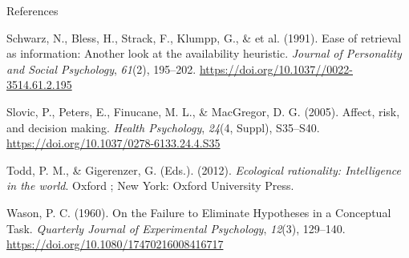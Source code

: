 \documentclass[
  ignorenonframetext,
]{beamer}
\newlength{\cslhangindent}
\newlength{\cslentryspacingunit} %
\newenvironment{CSLReferences}[2] %
 {%
  \setlength{\parindent}{0pt}
  \ifodd #1
  \let\oldpar\par
  \def\par{\hangindent=\cslhangindent\oldpar}
  \fi
  \setlength{\parskip}{#2\cslentryspacingunit}
 }%
 {}
\begin{document}
\begin{frame}{References}
\begin{CSLReferences}{1}{0}
\leavevmode{}%
Schwarz, N., Bless, H., Strack, F., Klumpp, G., \& et al. (1991). Ease
of retrieval as information: {Another} look at the availability
heuristic. \emph{Journal of Personality and Social Psychology},
\emph{61}(2), 195--202.
\url{https://doi.org/10.1037//0022-3514.61.2.195}

\leavevmode{}%
Slovic, P., Peters, E., Finucane, M. L., \& MacGregor, D. G. (2005).
Affect, risk, and decision making. \emph{Health Psychology},
\emph{24}(4, Suppl), S35--S40.
\url{https://doi.org/10.1037/0278-6133.24.4.S35}

\leavevmode{}%
Todd, P. M., \& Gigerenzer, G. (Eds.). (2012). \emph{Ecological
rationality: Intelligence in the world}. {Oxford ; New York}: {Oxford
University Press}.

\leavevmode{}%
Wason, P. C. (1960). On the {Failure} to {Eliminate Hypotheses} in a
{Conceptual Task}. \emph{Quarterly Journal of Experimental Psychology},
\emph{12}(3), 129--140. \url{https://doi.org/10.1080/17470216008416717}

\end{CSLReferences}
\end{frame}
\end{document}
